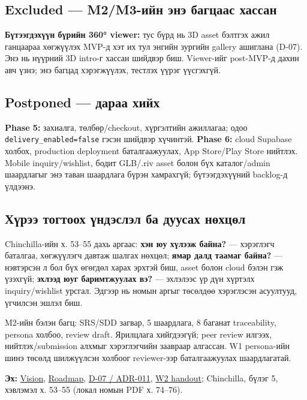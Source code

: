 \subsection{Excluded --- M2/M3-ийн энэ багцаас
хассан}\label{doc1-excluded-m2m3-ux438ux439ux43d-ux44dux43dux44d-ux431ux430ux433ux446ux430ux430ux441-ux445ux430ux441ux441ux430ux43d}

\textbf{Бүтээгдэхүүн бүрийн 360° viewer:} тус бүрд нь 3D asset бэлтгэх
ажил ганцаараа хөгжүүлэх MVP-д хэт их тул энгийн зургийн gallery
ашиглана (D-07). Энэ нь нүүрний 3D intro-г хассан шийдвэр биш.
Viewer-ийг post-MVP-д дахин авч үзнэ; энэ багцад хэрэгжүүлэх, тестлэх
үүрэг үүсгэхгүй.

\subsection{Postponed --- дараа
хийх}\label{doc1-postponed-ux434ux430ux440ux430ux430-ux445ux438ux439ux445}

\textbf{Phase 5:} захиалга, төлбөр/checkout, хүргэлтийн ажиллагаа; одоо
\nolinkurl{delivery_enabled=false} гэсэн шийдвэр хүчинтэй. \textbf{Phase
6:} cloud Supabase холбох, production deployment баталгаажуулах, App
Store/Play Store нийтлэх. Mobile inquiry/wishlist, бодит GLB/.riv asset
болон бүх каталог/admin шаардлагыг энэ таван шаардлага бүрэн хамрахгүй;
бүтээгдэхүүний backlog-д үлдээнэ.

\subsection{Хүрээ тогтоох үндэслэл ба дуусах
нөхцөл}\label{doc1-ux445ux4afux440ux44dux44d-ux442ux43eux433ux442ux43eux43eux445-ux4afux43dux434ux44dux441ux43bux44dux43b-ux431ux430-ux434ux443ux443ux441ux430ux445-ux43dux4e9ux445ux446ux4e9ux43b}

Chinchilla-ийн х. 53--55 дахь аргаас: \textbf{хэн юу хүлээж байна?} ---
хэрэглэгч баталгаа, хөгжүүлэгч давтаж шалгах нөхцөл; \textbf{ямар далд
таамаг байна?} --- нэвтэрсэн л бол бүх өгөгдөл харах эрхтэй биш, asset
болон cloud бэлэн гэж үзэхгүй; \textbf{эхлээд юуг баримтжуулах вэ?} ---
эхлэлээс үр дүн хүртэлх inquiry/wishlist урсгал. Эдгээр нь номын аргыг
төсөлдөө хэрэглэсэн асуултууд, үгчилсэн эшлэл биш.

M2-ийн бэлэн багц: SRS/SDD загвар, 5 шаардлага, 8 баганат traceability,
persona холбоо, review draft. Ярилцлага хийгдээгүй; peer review илгээх,
нийтлэх/submission алхмыг хэрэглэгчийн заавраар алгассан. W1 persona-ийн
шинэ төсөлд шилжүүлсэн холбоог reviewer-ээр баталгаажуулах шаардлагатай.

\textbf{Эх:} \href{../../phase-0/01-vision.md}{Vision},
\href{../../phase-0/10-roadmap.md}{Roadmap},
\href{../../../agent-context/DECISIONS.md}{D-07 / ADR-011},
\href{Software_Project_Documentation_Week_02_Handout.pdf}{W2 handout};
Chinchilla, бүлэг 5, хэвлэмэл х. 53--55 (локал номын PDF х. 74--76).
